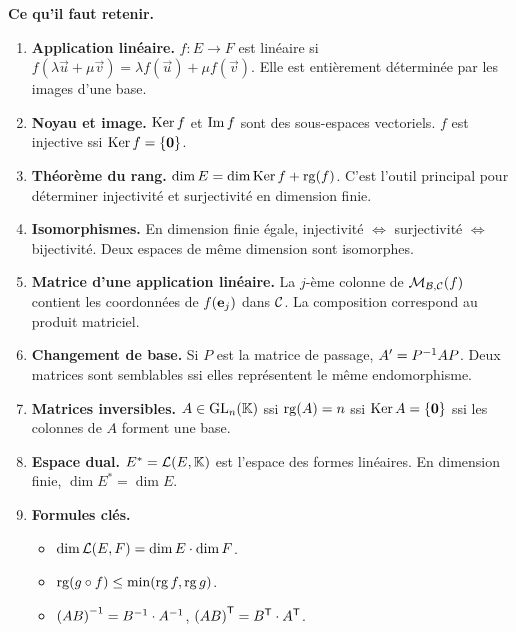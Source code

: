 \begin{framed}
\textbf{Ce qu'il faut retenir.}

\begin{enumerate}[label=\textbf{\arabic*.},leftmargin=2em]
  \item \textbf{Application linéaire.} $f\colon E\to F$ est linéaire si
    $f(\lambda\vec{u}+\mu\vec{v})=\lambda f(\vec{u})+\mu f(\vec{v})$.
    Elle est entièrement déterminée par les images d'une base.

  \item \textbf{Noyau et image.} $\operatorname{Ker} f$ et $\operatorname{Im} f$ sont des
    sous-espaces vectoriels. $f$ est injective ssi $\operatorname{Ker} f=\left\{\mathbf{0}\right\}$.

  \item \textbf{Théorème du rang.}
    $\dim E=\dim\operatorname{Ker} f+\operatorname{rg}(f)$.
    C'est l'outil principal pour déterminer injectivité et surjectivité
    en dimension finie.

  \item \textbf{Isomorphismes.} En dimension finie égale, injectivité
    $\Leftrightarrow$ surjectivité $\Leftrightarrow$ bijectivité. Deux
    espaces de même dimension sont isomorphes.

  \item \textbf{Matrice d'une application linéaire.} La $j$-ème colonne
    de $\mathcal{M}_{{\mathcal{B}},{\mathcal{C}}}(f)$ contient les coordonnées de $f(\mathbf{e}_{j})$ dans
    ${\mathcal{C}}$. La composition correspond au produit matriciel.

  \item \textbf{Changement de base.} Si $P$ est la matrice de passage,
    $A'={P}^{-1}AP$. Deux matrices sont semblables ssi elles représentent
    le même endomorphisme.

  \item \textbf{Matrices inversibles.} $A\in\operatorname{GL}_n({\mathbb{K}})$ ssi
    $\operatorname{rg}(A)=n$ ssi $\operatorname{Ker} A=\left\{\mathbf{0}\right\}$ ssi les colonnes de $A$ forment
    une base.

  \item \textbf{Espace dual.} $E^*={\mathcal{L}}(E,{\mathbb{K}})$ est l'espace des formes
    linéaires. En dimension finie, $\dim E^*=\dim E$.

  \item \textbf{Formules clés.}
    \begin{itemize}
      \item $\dim{\mathcal{L}}(E,F)=\dim E\cdot\dim F$.
      \item $\operatorname{rg}(g\circ f)\leq\min(\operatorname{rg} f,\operatorname{rg} g)$.
      \item ${(AB)}^{-1}={B}^{-1}\cdot{A}^{-1}$, \;
        ${(AB)}^{\mathsf{T}}={B}^{\mathsf{T}}\cdot{A}^{\mathsf{T}}$.
    \end{itemize}
\end{enumerate}
\end{framed}
